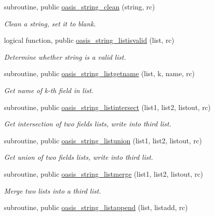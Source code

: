 \begin{DoxyCompactItemize}
subroutine, public \hyperlink{classmod__oasis__string_aaf462e055c2c6136ef5d142d03355673}{oasis\+\_\+string\+\_\+clean} (string, rc)
\begin{DoxyCompactList}\small\item\em Clean a string, set it to blank. \end{DoxyCompactList}\item 
logical function, public \hyperlink{classmod__oasis__string_ae8c50e9742e1f24cc0d7bfa9d476cd95}{oasis\+\_\+string\+\_\+listisvalid} (list, rc)
\begin{DoxyCompactList}\small\item\em Determine whether string is a valid list. \end{DoxyCompactList}\item 
subroutine, public \hyperlink{classmod__oasis__string_a4d3a28944ce786f4d8d8a9555c63f8cd}{oasis\+\_\+string\+\_\+listgetname} (list, k, name, rc)
\begin{DoxyCompactList}\small\item\em Get name of k-\/th field in list. \end{DoxyCompactList}\item 
subroutine, public \hyperlink{classmod__oasis__string_a8b9648bf4eb3a2373f1fac49e572436f}{oasis\+\_\+string\+\_\+listintersect} (list1, list2, listout, rc)
\begin{DoxyCompactList}\small\item\em Get intersection of two fields lists, write into third list. \end{DoxyCompactList}\item 
subroutine, public \hyperlink{classmod__oasis__string_a3482d80f258c8062e8dd0d4eff8135b7}{oasis\+\_\+string\+\_\+listunion} (list1, list2, listout, rc)
\begin{DoxyCompactList}\small\item\em Get union of two fields lists, write into third list. \end{DoxyCompactList}\item 
subroutine, public \hyperlink{classmod__oasis__string_adb1544a078e3abd743749f857fca5aee}{oasis\+\_\+string\+\_\+listmerge} (list1, list2, listout, rc)
\begin{DoxyCompactList}\small\item\em Merge two lists into a third list. \end{DoxyCompactList}\item 
subroutine, public \hyperlink{classmod__oasis__string_a47bd1c6d7ee6ea7dcec169fa140481aa}{oasis\+\_\+string\+\_\+listappend} (list, listadd, rc)

\end{DoxyCompactItemize}
